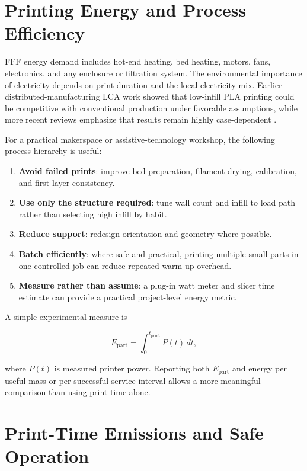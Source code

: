 \documentclass[11pt]{article}
\begin{document}
\section{Printing Energy and Process Efficiency}

FFF energy demand includes hot-end heating, bed heating, motors, fans, electronics, and any enclosure or filtration system. The environmental importance of electricity depends on print duration and the local electricity mix. Earlier distributed-manufacturing LCA work showed that low-infill PLA printing could be competitive with conventional production under favorable assumptions, while more recent reviews emphasize that results remain highly case-dependent \cite{kreiger2013,sola2024}.

For a practical makerspace or assistive-technology workshop, the following process hierarchy is useful:

\begin{enumerate}
  \item \textbf{Avoid failed prints}: improve bed preparation, filament drying, calibration, and first-layer consistency.
  \item \textbf{Use only the structure required}: tune wall count and infill to load path rather than selecting high infill by habit.
  \item \textbf{Reduce support}: redesign orientation and geometry where possible.
  \item \textbf{Batch efficiently}: where safe and practical, printing multiple small parts in one controlled job can reduce repeated warm-up overhead.
  \item \textbf{Measure rather than assume}: a plug-in watt meter and slicer time estimate can provide a practical project-level energy metric.
\end{enumerate}

A simple experimental measure is

\begin{equation}
E_{\mathrm{part}} = \int_0^{t_{\mathrm{print}}} P(t)\,dt,
\end{equation}

where $P(t)$ is measured printer power. Reporting both $E_{\mathrm{part}}$ and energy per useful mass or per successful service interval allows a more meaningful comparison than using print time alone.

\section{Print-Time Emissions and Safe Operation}
\end{document}
